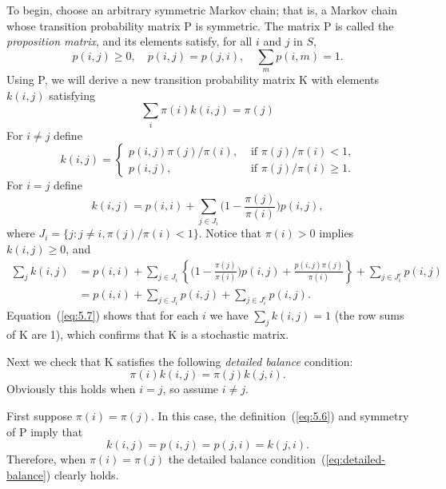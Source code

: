 To begin, choose an arbitrary symmetric Markov chain; that is, a Markov chain whose
transition probability matrix P is symmetric. The matrix P is called the 
\emph{proposition matrix}, and its elements
satisfy, for all $i$ and $j$ in $S$,
\begin{equation}
\label{eq:5.4}
p(i,j) \geq 0, \quad p(i,j) = p(j,i), \quad \sum_m p(i,m)=1.
\end{equation}
Using P, we will derive a new transition probability matrix K with elements
$k(i,j)$ satisfying
\begin{equation}
\label{eq:5.5}
\sum_i \pi(i)k(i,j) = \pi(j)
\end{equation}
For $i\neq j$ define
\begin{equation}
\label{eq:5.6}
k(i,j) = 
\begin{cases}
p(i,j)\pi(j)/\pi(i), & \text{ if $\pi(j)/\pi(i) < 1$,}\\
p(i,j), & \text{ if $\pi(j)/\pi(i) \geq 1$.}
\end{cases}
\end{equation}
%
%
%
%
For $i=j$ define
\begin{equation*}
k(i,j) = 
p(i,i) + \sum_{j\in J_i}\bigl(1 - \frac{\pi(j)}{\pi(i)}\bigr)p(i,j), 
\end{equation*}
where $J_i = \{j : j\neq i, \pi(j)/\pi(i) < 1\}$.
Notice that $\pi(i) > 0$ implies $k(i,j) \geq 0$, and
\begin{align}
\label{eq:5.7}
\sum_j k(i,j) 
&= p(i,i) + 
\sum_{j\in J_i}\left\{\bigl(1 - \frac{\pi(j)}{\pi(i)}\bigr)p(i,j)
+ \frac{p(i,j)\pi(j)}{\pi(i)}\right\} 
+ \sum_{j\in J_i^c}p(i,j)
\nonumber\\
&= p(i,i) + 
\sum_{j\in J_i}p(i,j)
+ \sum_{j\in J_i^c}p(i,j).
\end{align}
Equation~(\ref{eq:5.7}) shows that for each $i$ we have $\sum_j k(i,j) = 1$
(the row sums of K are 1), which confirms that K is a stochastic matrix.

Next we check that K satisfies the following \emph{detailed balance} condition:
\begin{equation}
\label{eq:detailed-balance}
\pi(i)k(i,j) = \pi(j)k(j,i).
\end{equation}
Obviously this holds when $i=j$, so assume $i\neq j$.

First suppose $\pi(i) = \pi(j)$.
In this case, the definition~(\ref{eq:5.6}) and symmetry of P imply that
\[
k(i,j) = p(i,j) = p(j,i) = k(j,i).
\]
Therefore, when $\pi(i) = \pi(j)$ the detailed balance
condition~(\ref{eq:detailed-balance}) clearly holds.

